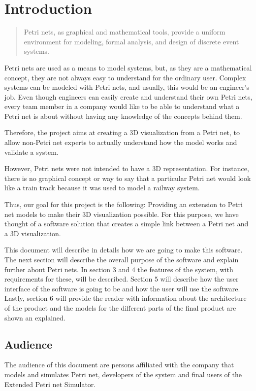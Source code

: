 \section{Introduction}

\begin{quotation}
Petri nets, as graphical and mathematical tools, provide a uniform environment for modeling, formal analysis, and design of discrete event systems. \cite{Zurawski:1994}
\end{quotation}

Petri nets are used as a means to model systems, but, as they are a mathematical concept, they are not always easy to understand for the ordinary user. Complex systems can be modeled with Petri nets, and usually, this would be an engineer's job. Even though engineers can easily create and understand their own Petri nets, every team member in a company would like to be able to understand what a Petri net is about without having any knowledge of the concepts behind them.

Therefore, the project aims at creating a 3D visualization from a Petri net, to allow non-Petri net experts to actually understand how the model works and validate a system.

However, Petri nets were not intended to have a 3D representation. For instance, there is no graphical concept or way to say that a particular Petri net would look like a train track because it was used to model a railway system. 

Thus, our goal for this project is the following: Providing an extension to Petri net models to make their 3D visualization possible. For this purpose, we have thought of a software solution that creates a simple link between a Petri net and a 3D visualization.

This document will describe in details how we are going to make this software. The next section will describe the overall purpose of the software and explain further about Petri nets. In section 3 and 4 the features of the system, with requirements for these, will be described. Section 5 will describe how the user interface of the software is going to be and how the user will use the software. Lastly, section 6 will provide the reader with information about the architecture of the product and the models for the different parts of the final product are shown an explained. 

\subsection{Audience}

The audience of this document are persons affiliated with the company that models and simulates Petri net, developers of the system and final users of the Extended Petri net Simulator.
